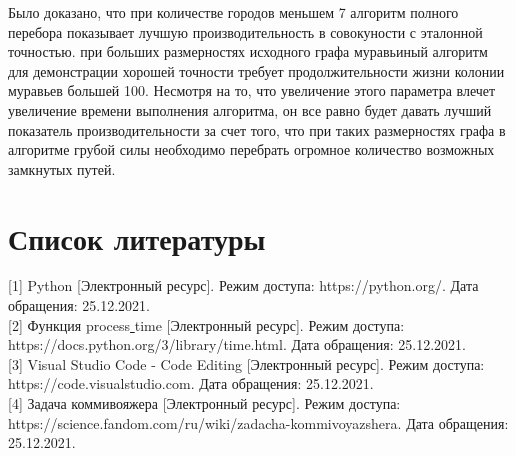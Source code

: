 \documentclass[12pt, a4paper]{report}
\begin{document}
	Было доказано, что при количестве городов меньшем 7 алгоритм полного перебора показывает лучшую производительность в совокуности с эталонной точностью. при больших размерностях исходного графа муравьиный алгоритм для демонстрации хорошей точности требует продолжительности жизни колонии муравьев большей 100. Несмотря на то, что увеличение этого параметра влечет увеличение времени выполнения алгоритма, он все равно будет давать лучший показатель производительности за счет того, что при таких размерностях графа в алгоритме грубой силы необходимо перебрать огромное количество возможных замкнутых путей.
	
	\chapter*{Список литературы}
	
	[1] Python [Электронный ресурс]. Режим доступа: https://python.org/. Дата обращения: 25.12.2021.\\
	
	[2] Функция process\underline{ }time [Электронный ресурс]. Режим доступа: \newline https://docs.python.org/3/library/time.html. Дата обращения: 25.12.2021.\\
	
	[3] Visual Studio Code - Code Editing [Электронный ресурс]. Режим доступа: https://code.visualstudio.com. Дата обращения: 25.12.2021.\\
	
	[4] Задача коммивояжера [Электронный ресурс]. Режим доступа: \newline https://science.fandom.com/ru/wiki/zadacha-kommivoyazshera. \newline Дата обращения: 25.12.2021.
	
\end{document}
